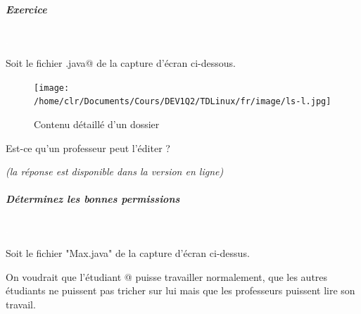 \documentclass[11pt,a4paper]{article}
\begin{document}
			
		\subparagraph{Exercice } 
		
					\textcolor{white}{.} \par
				
            \par
          
					Soit le fichier \verb@Max.java@ de la capture d'\'ecran ci-dessous.  
				
            \par
        \begin{figure}[hbt]
				    \begin{center}
					\texttt{[image: /home/clr/Documents/Cours/DEV1Q2/TDLinux/fr/image/ls-l.jpg]}
						\end{center}
                
                    \caption[Contenu d\'etaill\'e d'un dossier]{Contenu d\'etaill\'e d'un dossier}
                \end{figure}
                    
					Est-ce qu'un professeur peut l'\'editer ? 
				
            \par
         {\footnotesize\emph{(la r\'eponse est disponible dans la version en ligne)}\par} 
			
		\subparagraph{D\'eterminez les bonnes permissions} 
		
                \textcolor{white}{.} \par
            
							Soit le fichier "Max.java" de la capture d'\'ecran ci-dessus.
							
							On voudrait que l'\'etudiant @ puisse travailler  
							normalement, que les autres \'etudiants ne puissent pas tricher sur  
							lui mais que les professeurs puissent lire son travail.   
						
\end{document}
